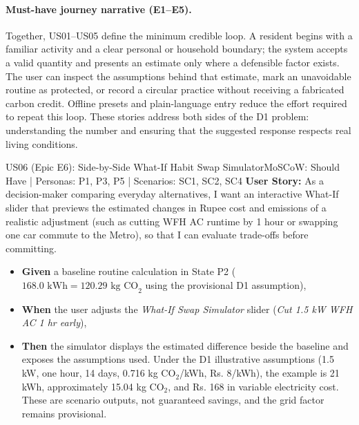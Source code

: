 \documentclass[12pt,a4paper]{article}
\begin{document}
\paragraph{Must-have journey narrative (E1--E5).}
Together, US01--US05 define the minimum credible loop. A resident begins with a familiar activity and a clear personal or household boundary; the system accepts a valid quantity and presents an estimate only where a defensible factor exists. The user can inspect the assumptions behind that estimate, mark an unavoidable routine as protected, or record a circular practice without receiving a fabricated carbon credit. Offline presets and plain-language entry reduce the effort required to repeat this loop. These stories address both sides of the D1 problem: understanding the number and ensuring that the suggested response respects real living conditions.

\begin{storybox}{US06 (Epic E6): Side-by-Side What-If Habit Swap Simulator}{MoSCoW: Should Have | Personas: P1, P3, P5 | Scenarios: SC1, SC2, SC4}
\textbf{User Story:} As a decision-maker comparing everyday alternatives, I want an interactive What-If slider that previews the estimated changes in Rupee cost and emissions of a realistic adjustment (such as cutting WFH AC runtime by 1 hour or swapping one car commute to the Metro), so that I can evaluate trade-offs before committing.
\begin{itemize}
    \item \textbf{Given} a baseline routine calculation in State P2 ($168.0\text{ kWh} = 120.29\text{ kg CO}_2$ using the provisional D1 assumption),
    \item \textbf{When} the user adjusts the \textit{What-If Swap Simulator} slider (\textit{Cut 1.5 kW WFH AC 1 hr early}),
    \item \textbf{Then} the simulator displays the estimated difference beside the baseline and exposes the assumptions used. Under the D1 illustrative assumptions (1.5 kW, one hour, 14 days, 0.716 kg CO$_2$/kWh, Rs. 8/kWh), the example is 21 kWh, approximately 15.04 kg CO$_2$, and Rs. 168 in variable electricity cost. These are scenario outputs, not guaranteed savings, and the grid factor remains provisional.
\end{itemize}
\end{storybox}
\end{document}
